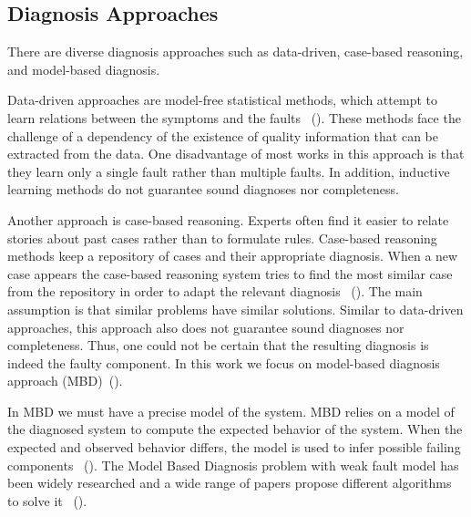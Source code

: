\documentclass[review]{elsarticle}
\begin{document}
\subsection{Diagnosis Approaches}
There are diverse diagnosis approaches such as data-driven, case-based reasoning, and model-based diagnosis.


Data-driven approaches are model-free statistical methods, which attempt to learn relations between the symptoms and the faults ~(\cite{murray2005machine}). These methods face the challenge of a dependency of the existence of quality information that can be extracted from the data. One disadvantage of most works in this approach is that they learn only a single fault rather than multiple faults. In addition, inductive learning methods do not guarantee sound diagnoses nor completeness.


Another approach is case-based reasoning. Experts often find it easier to relate stories about past cases rather than to formulate rules. Case-based reasoning methods keep a repository of cases and their appropriate diagnosis. When a new case appears the case-based reasoning system tries to find the most similar case from the repository in order to adapt the relevant diagnosis ~(\cite{aamodt1994case}). The main assumption is that similar problems have similar solutions. Similar to data-driven approaches, this approach also does not guarantee sound diagnoses nor completeness. Thus, one could not be certain that the resulting diagnosis is indeed the faulty component.
In this work we focus on model-based diagnosis approach (MBD)~(\cite{reiter1987theory}).


In MBD we must have a precise model of the system. MBD relies on a model of the diagnosed system to compute the expected behavior of the system. When the expected and observed behavior differs, the model is used to infer possible failing components ~(\cite{reiter1987theory}).
The Model Based Diagnosis problem with weak fault model has been widely researched and a wide range of papers propose different algorithms to solve it ~(\cite{reiter1987theory,de1987diagnosing,williams2007conflict,feldman2010approximate,siddiqi2007hierarchical}).
\end{document}
